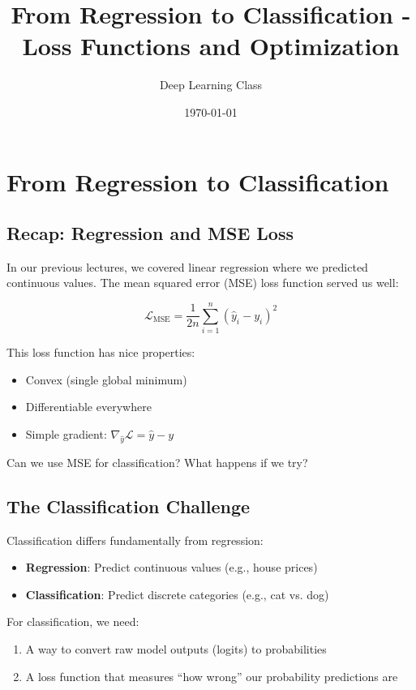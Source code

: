 \documentclass{article}
\title{From Regression to Classification - Loss Functions and Optimization}
\author{Deep Learning Class}
\date{\today}
\begin{document}
\maketitle

\section{From Regression to Classification}

\subsection{Recap: Regression and MSE Loss}

In our previous lectures, we covered linear regression where we predicted continuous values. The mean squared error (MSE) loss function served us well:

$$\mathcal{L}_{\text{MSE}} = \frac{1}{2n} \sum_{i=1}^n (\hat{y}_i - y_i)^2$$

This loss function has nice properties:
\begin{itemize}
\item Convex (single global minimum)
\item Differentiable everywhere
\item Simple gradient: $\nabla_{\hat{y}} \mathcal{L} = \hat{y} - y$
\end{itemize}

\begin{tcolorbox}[colback=yellow!5!white, colframe=orange!50!black, title=Key Question]
Can we use MSE for classification? What happens if we try?
\end{tcolorbox}

\subsection{The Classification Challenge}

Classification differs fundamentally from regression:
\begin{itemize}
\item \textbf{Regression}: Predict continuous values (e.g., house prices)
\item \textbf{Classification}: Predict discrete categories (e.g., cat vs. dog)
\end{itemize}

For classification, we need:
\begin{enumerate}
\item A way to convert raw model outputs (logits) to probabilities
\item A loss function that measures ``how wrong'' our probability predictions are
\end{enumerate}
\end{document}
